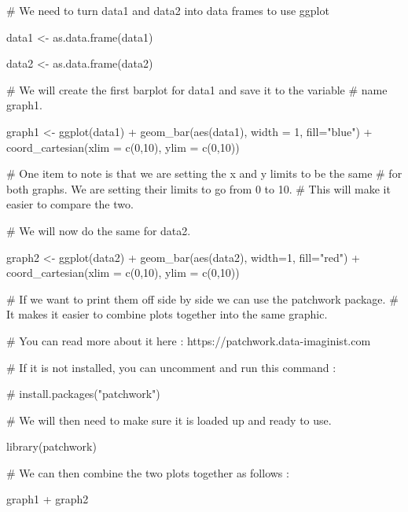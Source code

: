 \documentclass[
  letterpaper,
  DIV=11,
  numbers=noendperiod]{scrreprt}
\newenvironment{Shaded}{\begin{snugshade}}{\end{snugshade}}
\newcommand{\AttributeTok}[1]{\textcolor[rgb]{0.40,0.45,0.13}{#1}}
\newcommand{\CommentTok}[1]{\textcolor[rgb]{0.37,0.37,0.37}{#1}}
\newcommand{\DecValTok}[1]{\textcolor[rgb]{0.68,0.00,0.00}{#1}}
\newcommand{\FunctionTok}[1]{\textcolor[rgb]{0.28,0.35,0.67}{#1}}
\newcommand{\NormalTok}[1]{\textcolor[rgb]{0.00,0.23,0.31}{#1}}
\newcommand{\OtherTok}[1]{\textcolor[rgb]{0.00,0.23,0.31}{#1}}
\newcommand{\SpecialCharTok}[1]{\textcolor[rgb]{0.37,0.37,0.37}{#1}}
\newcommand{\StringTok}[1]{\textcolor[rgb]{0.13,0.47,0.30}{#1}}
\begin{document}
\begin{Shaded}
\begin{Highlighting}[]
\CommentTok{\# We need to turn data1 and data2 into data frames to use ggplot}

\NormalTok{data1 }\OtherTok{\textless{}{-}} \FunctionTok{as.data.frame}\NormalTok{(data1)}

\NormalTok{data2 }\OtherTok{\textless{}{-}} \FunctionTok{as.data.frame}\NormalTok{(data2)}

\CommentTok{\# We will create the first barplot for data1 and save it to the variable }
\CommentTok{\# name graph1.}

\NormalTok{graph1 }\OtherTok{\textless{}{-}} \FunctionTok{ggplot}\NormalTok{(data1) }\SpecialCharTok{+}
  \FunctionTok{geom\_bar}\NormalTok{(}\FunctionTok{aes}\NormalTok{(data1), }\AttributeTok{width =} \DecValTok{1}\NormalTok{, }\AttributeTok{fill=}\StringTok{"blue"}\NormalTok{) }\SpecialCharTok{+}
  \FunctionTok{coord\_cartesian}\NormalTok{(}\AttributeTok{xlim =} \FunctionTok{c}\NormalTok{(}\DecValTok{0}\NormalTok{,}\DecValTok{10}\NormalTok{), }\AttributeTok{ylim =} \FunctionTok{c}\NormalTok{(}\DecValTok{0}\NormalTok{,}\DecValTok{10}\NormalTok{))}

\CommentTok{\# One item to note is that we are setting the x and y limits to be the same}
\CommentTok{\# for both graphs. We are setting their limits to go from 0 to 10.}
\CommentTok{\# This will make it easier to compare the two.}

\CommentTok{\# We will now do the same for data2.}

\NormalTok{graph2 }\OtherTok{\textless{}{-}} \FunctionTok{ggplot}\NormalTok{(data2) }\SpecialCharTok{+}
  \FunctionTok{geom\_bar}\NormalTok{(}\FunctionTok{aes}\NormalTok{(data2), }\AttributeTok{width=}\DecValTok{1}\NormalTok{, }\AttributeTok{fill=}\StringTok{"red"}\NormalTok{) }\SpecialCharTok{+}
  \FunctionTok{coord\_cartesian}\NormalTok{(}\AttributeTok{xlim =} \FunctionTok{c}\NormalTok{(}\DecValTok{0}\NormalTok{,}\DecValTok{10}\NormalTok{), }\AttributeTok{ylim =} \FunctionTok{c}\NormalTok{(}\DecValTok{0}\NormalTok{,}\DecValTok{10}\NormalTok{))}

\CommentTok{\# If we want to print them off side by side we can use the patchwork package.}
\CommentTok{\# It makes it easier to combine plots together into the same graphic.}

\CommentTok{\# You can read more about it here : https://patchwork.data{-}imaginist.com}

\CommentTok{\# If it is not installed, you can uncomment and run this command :}

\CommentTok{\# install.packages("patchwork")}

\CommentTok{\# We will then need to make sure it is loaded up and ready to use.}

\FunctionTok{library}\NormalTok{(patchwork)}

\CommentTok{\# We can then combine the two plots together as follows : }

\NormalTok{graph1 }\SpecialCharTok{+}\NormalTok{ graph2 }
\end{Highlighting}
\end{Shaded}
\end{document}
